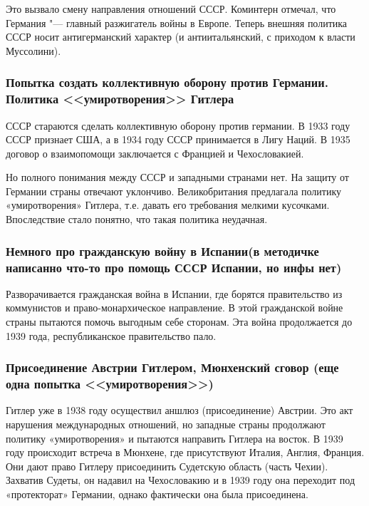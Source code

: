 Это вызвало смену направления отношений СССР. Коминтерн отмечал, что Германия "--- главный разжигатель войны в Европе. Теперь внешняя политика СССР носит антигерманский характер (и антиитальянский, с приходом к власти Муссолини). 

\subsubsection{\textbf{Попытка создать коллективную оборону против Германии. Политика <<умиротворения>> Гитлера}}

СССР стараются сделать коллективную оборону против германии. В 1933 году СССР признает США, а в 1934 году СССР принимается в Лигу Наций. В 1935 договор о взаимопомощи заключается с Францией и Чехословакией.

Но полного понимания между СССР и западными странами нет. На защиту от Германии страны отвечают уклончиво. Великобритания предлагала политику «умиротворения» Гитлера, т.е. давать его требования мелкими кусочками. Впоследствие стало понятно, что такая политика неудачная. 

\subsubsection{\textbf{Немного про гражданскую войну в Испании(в методичке написанно что-то про помощь СССР Испании, но инфы нет)}}

Разворачивается гражданская война в Испании, где борятся правительство из коммунистов и право-монархическое направление. В этой гражданской войне страны пытаются помочь выгодным себе сторонам. Эта война продолжается до 1939 года, республиканское правительство пало.

\subsubsection{\textbf{Присоединение Австрии Гитлером, Мюнхенский сговор (еще одна попытка <<умиротворения>>)}}

Гитлер уже в 1938 году осуществил аншлюз (присоединение) Австрии. Это акт нарушения международных отношений, но западные страны продолжают политику «умиротворения» и пытаются направить Гитлера на восток. В 1939 году происходит встреча в Мюнхене, где присутствуют Италия, Англия, Франция. Они дают право Гитлеру присоединить Судетскую область (часть Чехии). Захватив Судеты, он надавил на Чехословакию и в 1939 году она переходит под «протекторат» Германии, однако фактически она была присоединена.

